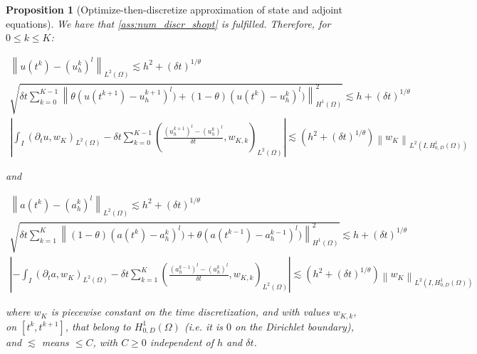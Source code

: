 \documentclass[english,a4paper,10pt,oneside]{scrbook}	%
\theoremstyle{break}
\newtheorem{prop}[equation]{Proposition}
\theoremstyle{remark}
\newcommand{\norm}[1]{\left\lVert#1\right\rVert}
\begin{document}
\begin{prop}[Optimize-then-discretize approximation of state and adjoint equations]
We have that \cref{ass:num_discr_shopt} is fulfilled. Therefore, for $0\leq k \leq K$:

\begin{align*}
	\norm{u(t^k)-(u_h^k)^l}_{L^2(\Omega)}\lesssim  h^2 + (\delta t)^{1/\theta}\\
	\sqrt{\delta t \sum_{k=0}^{K-1} \norm{\theta(u(t^{k+1}) - u_h^{k+1})^l) + (1-\theta)(u(t^{k}) - u_h^{k})^l)}_{H^1(\Omega)}^2} \lesssim h + (\delta t)^{1/\theta}\\
	\left | \int_I (\partial_t u , w_K)_{L^2(\Omega)}-\delta t \sum_{k=0}^{K-1}\left ( \frac{(u^{k+1}_h)^l - (u_h^k)^l}{\delta t} , w_{K,k}\right )_{L^2(\Omega)} \right |\lesssim \left ( h^2 + (\delta t)^{1/\theta} \right ) \norm{w_K}_{L^2(I,H^1_{0,D}(\Omega))}
\end{align*}

and

\begin{align*}
	\norm{a(t^k)-(a_h^k)^l}_{L^2(\Omega)}\lesssim  h^2 + (\delta t)^{1/\theta}\\
	\sqrt{\delta t \sum_{k=1}^{K} \norm{(1-\theta)(a(t^{k}) - a_h^{k})^l) + \theta(a(t^{k-1}) - a_h^{k-1})^l)}_{H^1(\Omega)}^2} \lesssim h + (\delta t)^{1/\theta}\\
	\left |- \int_I (\partial_t a , w_K)_{L^2(\Omega)}-\delta t \sum_{k=1}^{K}\left ( \frac{(a^{k-1}_h)^l - (a_h^{k})^l}{\delta t} , w_{K,k}\right )_{L^2(\Omega)} \right |\lesssim \left ( h^2 + (\delta t)^{1/\theta} \right ) \norm{w_K}_{L^2(I,H^1_{0,D}(\Omega))}
\end{align*}

where $w_K$ is piecewise constant on the time discretization, and with values $w_{K,k}$, on $[t^k,t^{k+1}]$, that belong to $H^1_{0,D}(\Omega)$ (i.e. it is $0$ on the Dirichlet boundary), and $\lesssim$ means $\leq C$, with $C\geq 0$ independent of $h$ and $\delta t$.

\end{prop}
\end{document}
